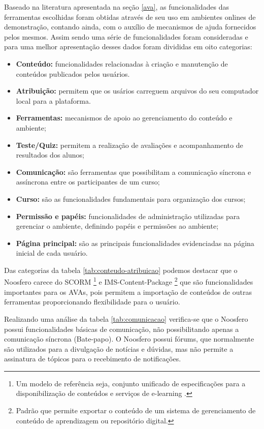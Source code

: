 Baseado na literatura apresentada na seção \ref{ava}, as funcionalidades das ferramentas escolhidas foram obtidas através de seu uso em ambientes onlines de demonstração, contando ainda, com o auxílio de mecanismos de ajuda fornecidos pelos mesmos. Assim sendo uma série de funcionalidades foram consideradas e para uma melhor apresentação desses dados foram divididas em oito categorias:
\begin{itemize}
\item \textbf{Conteúdo:} funcionalidades relacionadas à criação e manutenção de conteúdos publicados pelos usuários.
\item \textbf{Atribuição:} permitem que os usários carreguem arquivos do seu computador local para a plataforma.
\item \textbf{Ferramentas:} mecanismos de apoio ao gerenciamento do conteúdo e ambiente;
\item \textbf{Teste/Quiz:} permitem a realização de avaliações e acompanhamento de resultados dos alunos;
\item \textbf{Comunicação:} são ferramentas que possibilitam a comunicação síncrona e assíncrona entre os participantes de um curso;
\item \textbf{Curso:} são as funcionalidades fundamentais para organização dos cursos;
\item \textbf{Permissão e papéis:} funcionalidades de administração utilizadas para gerenciar o ambiente, definindo papéis e permissões ao ambiente;
\item \textbf{Página principal:} são as principais funcionalidades evidenciadas na página inicial de cada usuário.
\end{itemize}

Das categorias da tabela \ref{tab:conteudo-atribuicao} podemos destacar que o Noosfero carece do SCORM \footnote{Um modelo de referência seja, conjunto unificado de especificações para a disponibilização de conteúdos e serviços de e-learning \cite{de2006objetos}.} e IMS-Content-Package \footnote{Padrão que permite exportar o conteúdo de um sistema de gerenciamento de conteúdo de aprendizagem ou repositório digital.} que são funcionalidades importantes para os AVAs, pois permitem a importação de conteúdos de outras ferramentas proporcionando flexibilidade para o usuário.

Realizando uma análise da tabela \ref{tab:comunicacao} verifica-se que o Noosfero possui funcionalidades básicas de comunicação, não possibilitando apenas a comunicação síncrona (Bate-papo). O Noosfero possui fórums, que normalmente são utilizados para a divulgação de notícias e dúvidas, mas não permite a assinatura de tópicos para o recebimento de notificações.

